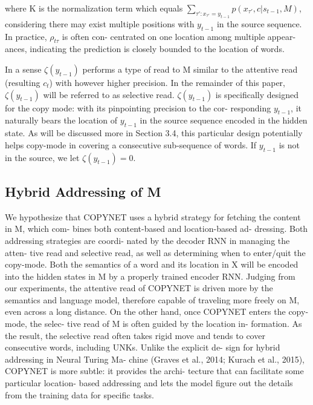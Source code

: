 \documentclass[UTF8]{ctexart}
\begin{document}
    where K is the normalization term which equals
    $\sum_{\tau':x_{\tau'}=y_{t-1}}{p(x_{\tau'},c|s_{t-1},M)}$, considering there
    may exist multiple positions with $y_{t−1}$ in the
    source sequence. In practice, $\rho_{t \tau} $ is often con-
    centrated on one location among multiple appear-
    ances, indicating the prediction is closely bounded
    to the location of words.

    In a sense $\zeta(y_{t−1})$ performs a type of read to
    M similar to the attentive read (resulting $c_t$) with
    however higher precision. In the remainder of
    this paper, $\zeta(y_{t−1})$ will be referred to as selective
    read.  $\zeta(y_{t−1})$ is specifically designed for the copy
    mode: with its pinpointing precision to the cor-
    responding $y_{t−1}$, it naturally bears the location of
    $y_{t−1}$ in the source sequence encoded in the hidden
    state. As will be discussed more in Section 3.4,
    this particular design potentially helps copy-mode
    in covering a consecutive sub-sequence of words.
    If $y_{t−1}$ is not in the source, we let $\zeta(y_{t−1})=0$.


    \subsection{Hybrid Addressing of M}
    We hypothesize that COPYNET uses a hybrid
    strategy for fetching the content in M, which com-
    bines both content-based and location-based ad-
    dressing. Both addressing strategies are coordi-
    nated by the decoder RNN in managing the atten-
    tive read and selective read, as well as determining
    when to enter/quit the copy-mode.
    Both the semantics of a word and its location
    in X will be encoded into the hidden states in M
    by a properly trained encoder RNN. Judging from
    our experiments, the attentive read of COPYNET is
    driven more by the semantics and language model,
    therefore capable of traveling more freely on M,
    even across a long distance. On the other hand,
    once COPYNET enters the copy-mode, the selec-
    tive read of M is often guided by the location in-
    formation. As the result, the selective read often
    takes rigid move and tends to cover consecutive
    words, including UNKs. Unlike the explicit de-
    sign for hybrid addressing in Neural Turing Ma-
    chine (Graves et al., 2014; Kurach et al., 2015),
    COPYNET is more subtle: it provides the archi-
    tecture that can facilitate some particular location-
    based addressing and lets the model figure out the
    details from the training data for specific tasks.
\end{document}
